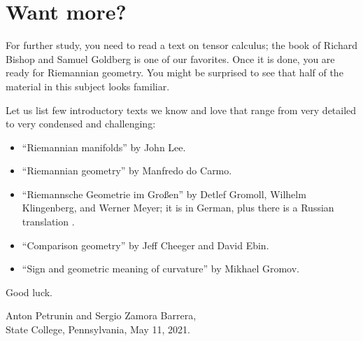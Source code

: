 \chapter{Want more?}

For further study, you need to read a text on tensor calculus;
the book of Richard Bishop and Samuel Goldberg \cite{bishop-goldberg} is one of our favorites.
Once it is done, you are ready for Riemannian geometry.
You might be surprised to see that half of the material in this subject looks familiar.

Let us list few introductory texts we know and love that range from very detailed to very condensed and challenging:
\begin{itemize}
\item ``Riemannian manifolds''  \cite{lee2006riemannian} by John Lee.
\item ``Riemannian geometry'' \cite{carmo1992riemannian} by Manfredo do Carmo.
\item ``Riemannsche Geometrie im Großen'' \cite{gromoll-klingenberg-meyer} by 
Detlef Gromoll,
Wilhelm Klingenberg, 
and  Werner Meyer; it is in German, plus there is a Russian translation \cite{gromoll-klingenberg-meyer-ru}.
\item ``Comparison geometry'' \cite{cheeger-ebin} by Jeff Cheeger and David Ebin. 
\item ``Sign and geometric meaning of curvature'' \cite{gromov-1991} by Mikhael Gromov.
\end{itemize}
Good luck.

\begin{flushright}
Anton Petrunin and Sergio Zamora Barrera,\\
State College, Pennsylvania, May 11, 2021.
\end{flushright}
